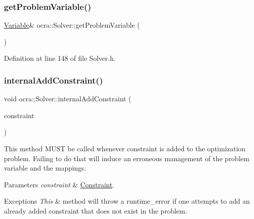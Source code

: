 \subsubsection{\texorpdfstring{get\+Problem\+Variable()}{getProblemVariable()}}
{\footnotesize\ttfamily \hyperlink{classocra_1_1Variable}{Variable}\& ocra\+::\+Solver\+::get\+Problem\+Variable (\begin{DoxyParamCaption}{ }\end{DoxyParamCaption})\hspace{0.3cm}{\ttfamily [inline]}}



Definition at line 148 of file Solver.\+h.

\hypertarget{classocra_1_1Solver_a18205ea34fae445bc22444655654552e}{}\label{classocra_1_1Solver_a18205ea34fae445bc22444655654552e} 
\subsubsection{\texorpdfstring{internal\+Add\+Constraint()}{internalAddConstraint()}}
{\footnotesize\ttfamily void ocra\+::\+Solver\+::internal\+Add\+Constraint (\begin{DoxyParamCaption}\item[{const \hyperlink{namespaceocra_af10341108ce661566aad00908668e2b1}{Generic\+Constraint} \&}]{constraint }\end{DoxyParamCaption})\hspace{0.3cm}{\ttfamily [protected]}}

This method M\+U\+ST be called whenever constraint is added to the optimization problem. Failing to do that will induce an erroneous management of the problem variable and the mappings.


\begin{DoxyParams}{Parameters}
{\em constraint} & \hyperlink{classocra_1_1Constraint}{Constraint}. \\
\hline
\end{DoxyParams}

\begin{DoxyExceptions}{Exceptions}
{\em This} & method will throw a runtime\+\_\+error if one attempts to add an already added constraint that does not exist in the problem. \\
\hline
\end{DoxyExceptions}


